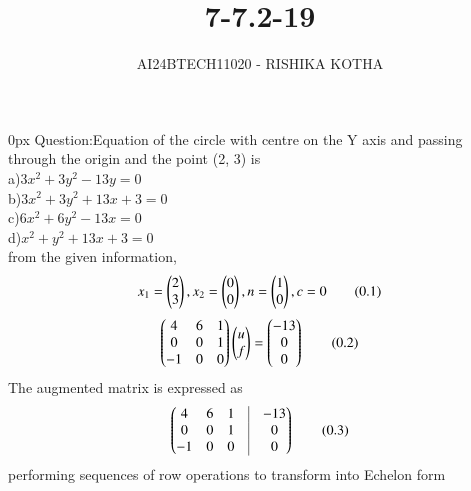 \documentclass[journal]{IEEEtran}
\begin{document}

\vspace{3cm}

\title{7-7.2-19}
\author{AI24BTECH11020 - RISHIKA KOTHA}
{\let\newpage\relax\maketitle}

\renewcommand{\thefigure}{\theenumi}
\renewcommand{\thetable}{\theenumi}
\setlength{\intextsep}{10pt} %


\renewcommand{\thetable}{\theenumi}
\parindent 0px
Question:Equation of the circle with centre on the Y axis and passing through the origin and the point (2, 3) is
\\
a)$3x^2+3y^2-13y=0$\\
b)$3x^2+3y^2+13x+3=0$\\
c)$6x^2+6y^2-13x=0$\\
d)$x^2+y^2+13x+3=0$\\
\solution
from the given information,
\begin{align*}
	x_1=\begin{pmatrix}2\\3\end{pmatrix}, x_2=\begin{pmatrix}0\\0\end{pmatrix},n=\begin{pmatrix}1\\0\end{pmatrix},c=0 \tag{0.1}
\end{align*}
\begin{align*}
	\begin{pmatrix}4 & 6 & 1 \\
	       0 & 0 & 1 \\
	       -1 & 0 & 0\end{pmatrix}
	       \begin{pmatrix}u\\f\end{pmatrix}=\begin{pmatrix}-13\\0\\0\end{pmatrix}\tag{0.2}
\end{align*}
The augmented matrix is expressed as
\begin{align*}
	\myvec{4 & 6 & 1 & \vrule & -13\\
         0 &  0 & 1 & \vrule & 0\\
	 -1 &  0 & 0 & \vrule & 0} \tag{0.3}
\end{align*}
performing sequences of row operations to transform into Echelon form
\end{document}
